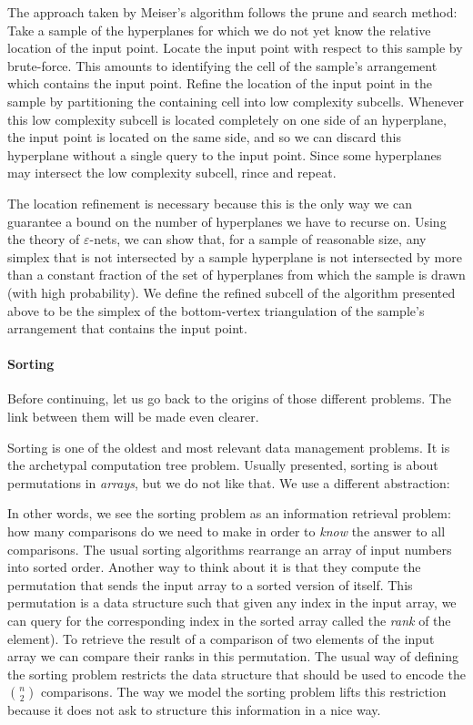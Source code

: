The approach taken by Meiser's algorithm follows the prune and search method:
Take a sample of the hyperplanes for which we do not yet know the relative
location of the input point. Locate the input point with respect to this sample
by brute-force. This amounts to identifying the cell of the sample's arrangement
which contains the input point. Refine the location of the input point in the
sample by partitioning the containing cell into low complexity subcells. Whenever
this low complexity subcell is located completely on one side of an hyperplane,
the input point is located on the same side, and so we can discard this
hyperplane without a single query to the input point. Since some hyperplanes
may intersect the low complexity subcell, rince and repeat.

The location refinement is necessary because this is the only way we can
guarantee a bound on the number of hyperplanes we have to recurse on.
Using the theory of \(\varepsilon\)-nets, we can show that, for a sample of
reasonable size, any simplex that is not intersected by a sample hyperplane
is not intersected by more than a constant fraction of the set of
hyperplanes from which the sample is drawn (with high probability). We
define the refined subcell of the algorithm presented above to be the simplex
of the bottom-vertex triangulation of the sample's arrangement that contains
the input point.


\paragraph{Sorting}
Before continuing, let us go back to the origins of those different problems.
The link between them will be made even clearer.

Sorting is one of the oldest and most relevant data management problems.
It is the archetypal computation tree problem.
%
Usually presented, sorting is about permutations in \emph{arrays}, but we do
not like that. We use a different abstraction:
%


In other words, we see the sorting problem as an information retrieval problem:
how many comparisons do we need to make in order to \emph{know} the answer to
all comparisons.
%
The usual sorting algorithms rearrange an array of input numbers into sorted
order. Another way to think about it is that they compute the permutation that
sends the input array to a sorted version of itself. This permutation is a data
structure such that given any index in the input array, we can query for the
corresponding index in the sorted array called the \emph{rank} of the element).
To retrieve the result of a comparison of two elements of the input array we can
compare their ranks in this permutation.
The usual way of defining the sorting problem restricts the data structure that
should be used to encode the \(n \choose 2\) comparisons.
The way we model the sorting problem lifts this restriction because it does not
ask to structure this information in a nice way.

